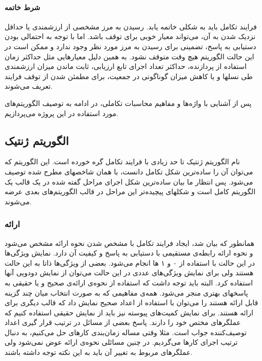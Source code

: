 \documentclass{report}
\begin{document}
\paragraph{شرط خاتمه}
فرایند تکامل باید به شکلی خاتمه یابد. رسیدن به مرز مشخصی از ارزشمندی یا حداقل نزدیک شدن به آن، می‌تواند معیار خوبی برای توقف باشد. اما با توجه به احتمالی بودن دستیابی به پاسخ، تضمینی برای رسیدن به مرز مورد نظر وجود ندارد و ممکن است در این حالت الگوریتم هیچ وقت متوقف نشود. به همین دلیل معیارهایی مثل حداکثر زمان استفاده از پردازنده، حداکثر تعداد اجرای تابع ارزیابی، ثابت ماندن میزان ارزشمندی طی نسلها و یا کاهش میزان گوناگونی در جمعیت، برای مطمئن شدن از توقف فرایند تعریف می‌شوند. 

پس از آشنایی با واژه‌ها و مفاهیم محاسبات تکاملی، در ادامه به توصیف الگوریتم‌های مورد استفاده در این پروژه می‌پردازیم.

\subsection{الگوریتم ژنتیک}
نام الگوریتم ژنتیک تا حد زیادی با فرایند تکامل گره خورده است. این الگوریتم که می‌توان آن را ساده‌ترین شکل تکامل دانست، با همان شاخصهای مطرح شده توصیف می‌شود. پس انتظار ما بیان ساده‌ترین شکل اجرای مراحل گفته شده در یک قالب یک الگوریتم کامل است و شکلهای پیچیده‌تر این مراحل در قالب الگوریتم‌های بعدی عرضه می‌شوند.

\subsubsection{ارائه}
همانطور که بیان شد، ایجاد فرایند تکامل با مشخص شدن نحوه ارائه مشخص می‌شود و نحوه ارائه رابطه‌ی مستقیمی با دستیابی به پاسخ و کیفیت آن دارد.
نمایش ویژگی‌ها در این حالت با استفاده از ۰ و ۱ ها انجام می‌شود. بعضی از ویژگی‌ها ذاتا به این حالت هستند ولی برای نمایش ویژگی‌های عددی در این حالت می‌توان از نمایش دودویی آنها استفاده کرد. البته باید توجه داشت که استفاده از نحوه‌ی ارائه‌ی صحیح و یا حقیقی به پاسخهای بهتری منجر می‌شود.
همه‌ی مفاهیمی که به صورت انتخاب میان چند گزینه قابل ارائه هستند را می‌توان با استفاده از اعداد صحیح نمایش داد که قالب دیگری برای ارائه هستند. برای نمایش کمیت‌های پیوسته نیز باید از نمایش حقیقی استفاده کنیم که عملگرهای مختص خود را دارند.
پاسخ بعضی از مسائل در ترتیب قرار گیری اعداد توصیف‌کننده جواب است. مثلا وقتی مساله زمان‌بندی کارهای حل می‌کنیم، به دنبال ترتیب اجرای کارها می‌گردیم. در چنین مسائلی نحوه‌ی ارائه عوض نمی‌شود ولی عملگرهای مربوط به تغییر آن باید به این نکته توجه داشته باشند.
\end{document}
